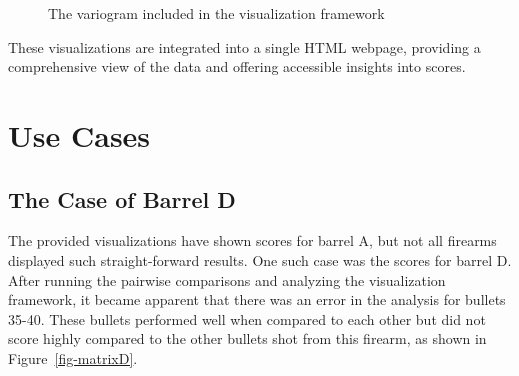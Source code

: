 \documentclass[
  12pt]{article}
\begin{document}
\begin{figure}


\caption{\label{fig-variogramA}The variogram included in the
visualization framework}

\end{figure}%

These visualizations are integrated into a single HTML webpage,
providing a comprehensive view of the data and offering accessible
insights into scores.

\section{Use Cases}\label{use-cases}

\subsection{The Case of Barrel D}\label{the-case-of-barrel-d}

The provided visualizations have shown scores for barrel A, but not all
firearms displayed such straight-forward results. One such case was the
scores for barrel D. After running the pairwise comparisons and
analyzing the visualization framework, it became apparent that there was
an error in the analysis for bullets 35-40. These bullets performed well
when compared to each other but did not score highly compared to the
other bullets shot from this firearm, as shown in
Figure~\ref{fig-matrixD}.
\end{document}
